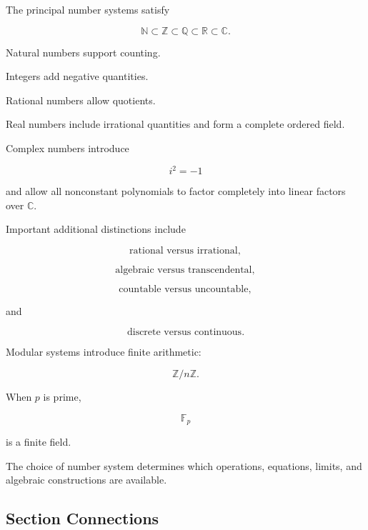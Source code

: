 The principal number systems satisfy

\[
\boxed{
\mathbb{N}
\subset
\mathbb{Z}
\subset
\mathbb{Q}
\subset
\mathbb{R}
\subset
\mathbb{C}.
}
\]

Natural numbers support counting.

Integers add negative quantities.

Rational numbers allow quotients.

Real numbers include irrational quantities and form a complete ordered field.

Complex numbers introduce

\[
\boxed{
i^2=-1
}
\]

and allow all nonconstant polynomials to factor completely into linear
factors over \(\mathbb{C}\).

Important additional distinctions include

\[
\boxed{
\text{rational versus irrational},
}
\]

\[
\boxed{
\text{algebraic versus transcendental},
}
\]

\[
\boxed{
\text{countable versus uncountable},
}
\]

and

\[
\boxed{
\text{discrete versus continuous}.
}
\]

Modular systems introduce finite arithmetic:

\[
\boxed{
\mathbb{Z}/n\mathbb{Z}.
}
\]

When \(p\) is prime,

\[
\boxed{
\mathbb{F}_p
}
\]

is a finite field.

The choice of number system determines which operations, equations, limits,
and algebraic constructions are available.

\subsection{Section Connections}
\label{subsec:number-systems-connections}


